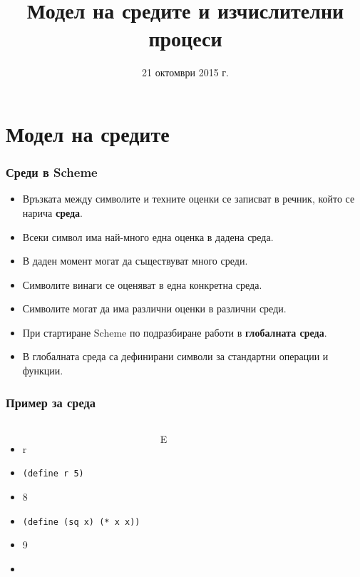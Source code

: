 \documentclass{beamer}
\title[Среди и процеси]{Модел на средите и изчислителни процеси}
\date{21 октомври 2015 г.}
\begin{document}
\begin{frame}
  \titlepage
\end{frame}

\section{Модел на средите}

\begin{frame}
  \frametitle{Среди в Scheme}

  \begin{itemize}[<+->]
  \item Връзката между символите и техните оценки се записват в речник, който се нарича \textbf{среда}.
  \item Всеки символ има най-много една оценка в дадена среда.
  \item В даден момент могат да съществуват много среди.
  \item Символите винаги се оценяват в една конкретна среда.
  \item \alert{Символите могат да има различни оценки в различни среди.}
  \item При стартиране Scheme по подразбиране работи в \textbf{глобалната среда}.
  \item В глобалната среда са дефинирани символи за стандартни операции и функции.
  \end{itemize}
\end{frame}

\begin{frame}
  \frametitle{Пример за среда}

  \begin{columns}[t,onlytextwidth]
    {}

    \begin{itemize}[<+->]
    \item \evalstoerr r
    \item \tt{(define r 5)}
    \item {}8
    \item \tt{(define (sq x) (* x x))}
    \item {}9
    \item {}
    \end{itemize}

    {}

    \begin{env}{E}
    \end{env}
  \end{columns}
\end{frame}
\end{document}
